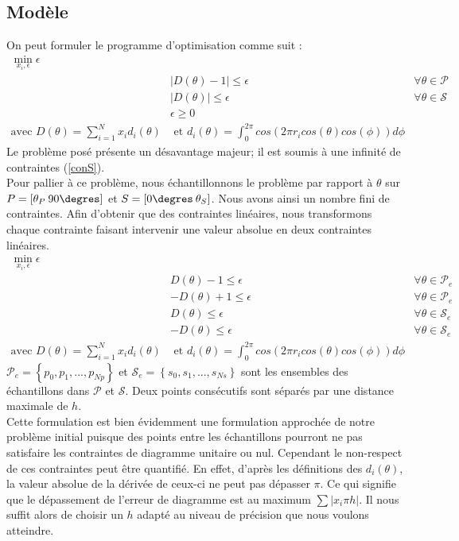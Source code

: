 \subsection{Modèle}
On peut formuler le programme d'optimisation comme suit :
\begin{align}
\min_{x_i,\epsilon} \epsilon & \\
&|D(\theta)-1|  \leq \epsilon &\forall \theta\in \mathcal{P}\\
&|D(\theta)| \leq \epsilon & \forall \theta\in \mathcal{S}\label{conS}\\
& \epsilon \geq 0\\
\text{avec } D(\theta) = \sum_{i=1}^N x_i d_i(\theta) & \text{ et } d_i(\theta) = \int_0^{2 \pi} cos(2 \pi r_i cos(\theta)cos(\phi)) d\phi \label{eq:di}
\end{align}
Le problème posé présente un désavantage majeur; il est soumis à une infinité de contraintes (\ref{conS}).\\
Pour pallier à ce problème, nous échantillonnons le problème par rapport à $\theta$ sur $P = [\theta_P\: 90\degres  ]$ et $S = [0\degres \:\theta_S]$. Nous avons ainsi un nombre fini de contraintes. Afin d'obtenir que des contraintes linéaires, nous transformons chaque contrainte faisant intervenir une valeur absolue en deux contraintes linéaires. 
\begin{align}
\min_{x_i,\epsilon} \epsilon & & \nonumber\\
& D(\theta)-1\leq \epsilon & \forall \theta\in \mathcal{P}_e \\
& -D(\theta)+1\leq \epsilon & \forall \theta\in \mathcal{P}_e\\
& D(\theta)\leq \epsilon & \forall \theta\in \mathcal{S}_e\\
& -D(\theta)\leq \epsilon &\forall \theta\in \mathcal{S}_e\\
\text{avec } D(\theta) = \sum_{i=1}^N x_i d_i(\theta) & \text{ et } d_i(\theta) = \int_0^{2 \pi} cos(2 \pi r_i cos(\theta)cos(\phi)) d\phi 
\end{align}
$\mathcal{P}_e = \left\lbrace p_0,p_1,...,p_{Np}\right\rbrace$ et $\mathcal{S}_e= \left\lbrace s_0,s_1,...,s_{Ns}\right\rbrace$ sont les ensembles des échantillons dans $\mathcal{P}$ et $\mathcal{S}$. Deux points consécutifs sont séparés par une distance maximale de $h$.\\
Cette formulation est bien évidemment une formulation approchée de notre problème initial puisque des points entre les échantillons pourront ne pas satisfaire les contraintes de diagramme unitaire ou nul. Cependant le non-respect de ces contraintes peut être quantifié. En effet, d'après les définitions des $d_i(\theta)$, la valeur absolue de la dérivée de ceux-ci ne peut pas dépasser $\pi$. Ce qui signifie que le dépassement de l'erreur de diagramme est au maximum $\sum |x_i\pi h|$. Il nous suffit alors de choisir un $h$ adapté au niveau de précision que nous voulons atteindre. 
